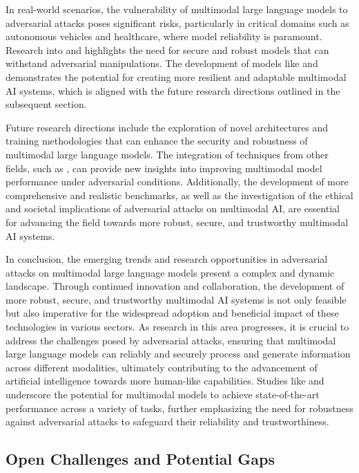\documentclass[11pt,a4paper]{article}
\begin{document}
In real-world scenarios, the vulnerability of multimodal large language models to adversarial attacks poses significant risks, particularly in critical domains such as autonomous vehicles and healthcare, where model reliability is paramount. Research into \cite{arxiv:2403.03627} and \cite{doi:10.1609/aaai.v39i4.32396} highlights the need for secure and robust models that can withstand adversarial manipulations. The development of models like \cite{arxiv:2408.13257} and \cite{arxiv:2404.07922} demonstrates the potential for creating more resilient and adaptable multimodal AI systems, which is aligned with the future research directions outlined in the subsequent section.

Future research directions include the exploration of novel architectures and training methodologies that can enhance the security and robustness of multimodal large language models. The integration of techniques from other fields, such as \cite{arxiv:2506.04788}, can provide new insights into improving multimodal model performance under adversarial conditions. Additionally, the development of more comprehensive and realistic benchmarks, as well as the investigation of the ethical and societal implications of adversarial attacks on multimodal AI, are essential for advancing the field towards more robust, secure, and trustworthy multimodal AI systems.

In conclusion, the emerging trends and research opportunities in adversarial attacks on multimodal large language models present a complex and dynamic landscape. Through continued innovation and collaboration, the development of more robust, secure, and trustworthy multimodal AI systems is not only feasible but also imperative for the widespread adoption and beneficial impact of these technologies in various sectors. As research in this area progresses, it is crucial to address the challenges posed by adversarial attacks, ensuring that multimodal large language models can reliably and securely process and generate information across different modalities, ultimately contributing to the advancement of artificial intelligence towards more human-like capabilities. Studies like \cite{arxiv:2406.18193} and \cite{doi:10.1109/jstsp.2026.3653157} underscore the potential for multimodal models to achieve state-of-the-art performance across a variety of tasks, further emphasizing the need for robustness against adversarial attacks to safeguard their reliability and trustworthiness.


\subsection{Open Challenges and Potential Gaps}
\end{document}
